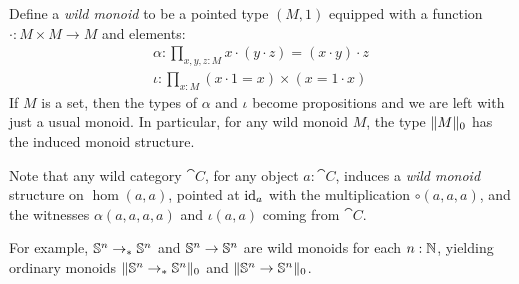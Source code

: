 \documentclass[english,a4]{article}
\newcommand{\ptdto}{\to_\ast}%
\newcommand{\setTrunc}[1]{\Trunc{#1}_0}
\begin{document}
\begin{remark}
  Define a \emph{wild monoid} to be a pointed type $(M,1)$ equipped with a
  function $\cdot : M \times M \to M$ and elements:
  \begin{gather*}
    \alpha: \prod_{x,y,z:M}x\cdot(y\cdot z) = (x\cdot y) \cdot z \\
    \iota: \prod_{x:M} (x\cdot 1 = x) \times (x = 1 \cdot x)
  \end{gather*}
  If $M$ is a set, then the types of $\alpha$ and $\iota$ become propositions
  and we are left with just a usual monoid. In particular, for any wild monoid
  $M$, the type $\setTrunc M$ has the induced monoid structure.

  Note that any wild category $\cat C$, for any object $a:\cat C$, induces a
  \emph{wild monoid} structure on $\hom(a,a)$, pointed at $\mathord{\mathrm{id}}_a$ with the
  multiplication $\circ(a,a,a)$, and the witnesses $\alpha(a,a,a,a)$ and $\iota(a,a)$
  coming from $\cat C$.

  For example, $\Sn n \ptdto \Sn n$ and ${\mathbb S^{n}} \to {\mathbb S^{n}}$ are wild monoids for each $n:\mathbb{N}$,
  yielding ordinary  monoids $\setTrunc{\Sn n \ptdto \Sn n}$ and $\setTrunc{\Sn n \to \Sn n}$.
  \label{rem:wild-monoids}
\end{remark}

\printbibliography
\end{document}
